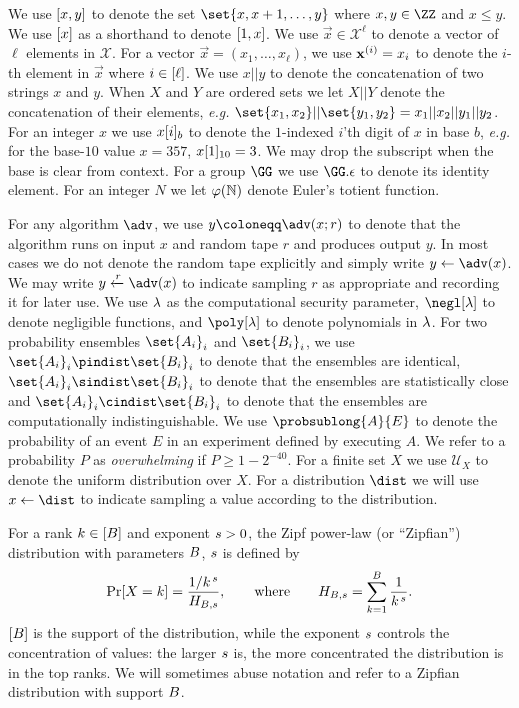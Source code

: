 We use $[x, y]$ to denote the set $\set{x, x+1, \ldots, y}$ where $x, y \in \Z$ and $x \le y$.
We use $[x]$ as a shorthand to denote $[1, x]$.
We use $\vec{x} \in \mathcal{X}^{\ell}$ to denote a vector of $\ell$ elements in $\mathcal{X}$.
For a vector $\vec{x} = (x_1, \ldots, x_\ell)$, we use $\mathbf{x}^{(i)} = x_i$ to denote the $i$-th element in $\vec{x}$ where $i \in [\ell]$.
We use $x||y$ to denote the concatenation of two strings $x$ and $y$.
When $X$ and $Y$ are ordered sets we let $X||Y$ denote the concatenation of their elements, \emph{e.g.} $\set{x_1, x_2}||\set{y_1, y_2} = x_1||x_2||y_1||y_2$.
For an integer $x$ we use $x[i]_b$ to denote the $1$-indexed $i$'th digit of $x$ in base $b$, \emph{e.g.} for the base-$10$ value $x = 357$, $x[1]_{10} = 3$.
We may drop the subscript when the base is clear from context.
For a group $\GG$ we use $\GG.\epsilon$ to denote its identity element.
For an integer $N$ we let $\varphi(\mathbb{N})$ denote Euler's totient function.

For any algorithm $\adv$, we use $y \coloneqq \adv(x; r)$ to denote that the algorithm runs on input $x$ and random tape $r$ and produces output $y$.
In most cases we do not denote the random tape explicitly and simply write $y \gets \adv(x)$.
We may write $y \xleftarrow{r} \adv(x)$ to indicate sampling $r$ as appropriate and recording it for later use.
We use $\lambda$ as the computational security parameter, $\negl[\secpar]$ to denote negligible functions, and $\poly[\secpar]$ to denote polynomials in $\lambda$.
For two probability ensembles $\set{A_i}_i$ and $\set{B_i}_i$, we use $\set{A_i}_i \pindist \set{B_i}_i$ to denote that the ensembles are identical, $\set{A_i}_i \sindist \set{B_i}_i$ to denote that the ensembles are statistically close and $\set{A_i}_i \cindist \set{B_i}_i$ to denote that the ensembles are computationally indistinguishable.
We use $\probsublong{A}{E}$ to denote the probability of an event $E$ in an experiment defined by executing $A$.
We refer to a probability $P$ as \emph{overwhelming} if $P \geq 1 - 2^{-40}$.
For a finite set $X$ we use $\mathcal{U}_X$ to denote the uniform distribution over $X$.
For a distribution $\dist$ we will use $x \gets \dist$ to indicate sampling a value according to the distribution.

For a rank $k\in [B]$ and exponent $s>0$,
the Zipf power-law (or ``Zipfian'') distribution \cite{powers1998applications} with parameters $B$, $s$ is defined by
$$
	\Pr[X=k]=\frac{1/k^{\,s}}{H_{B,s}},
	\qquad\text{where}\qquad
	H_{B,s}=\sum_{k=1}^{B}\frac{1}{k^{\,s}}.
$$
$[B]$ is the support of the distribution, while the exponent $s$ controls the concentration of values: the larger $s$ is, the more concentrated the distribution is in the top ranks.
We will sometimes abuse notation and refer to a Zipfian distribution with support $B$.
